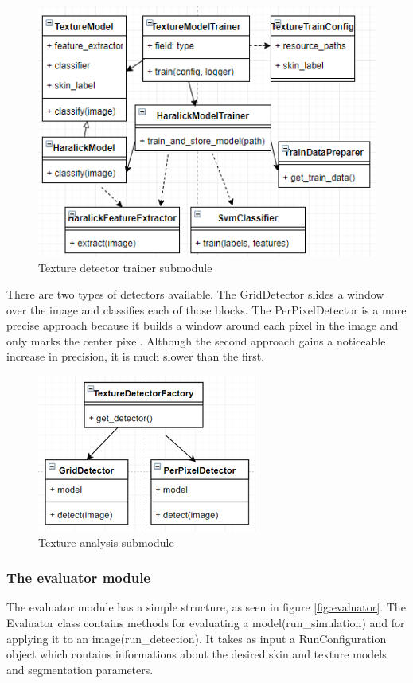 \documentclass[12pt]{report}
\begin{document}
	\begin{figure}[h!]
		\centering
		\includegraphics[]{design/texture_train.png}
		\caption{Texture detector trainer submodule}
		\label{fig:texture_train}
	\end{figure}

	There are two types of detectors available. The GridDetector slides a window over the image and classifies each of those blocks. The PerPixelDetector is a more precise approach because it builds a window around each pixel in the image and only marks the center pixel. Although the second approach gains a noticeable increase in precision, it is much slower than the first.

	\begin{figure}[h!]
		\centering
		\includegraphics[]{design/texture_detect.png}
		\caption{Texture analysis submodule}
		\label{fig:texture_detect}
	\end{figure}
	
	\subsubsection{The evaluator module}
	
	The evaluator module has a simple structure, as seen in figure \ref{fig:evaluator}. The Evaluator class contains methods for evaluating a model(run\_simulation) and for applying it to an image(run\_detection). It takes as input a RunConfiguration object which contains informations about the desired skin and texture models and segmentation parameters.
	
\end{document}
